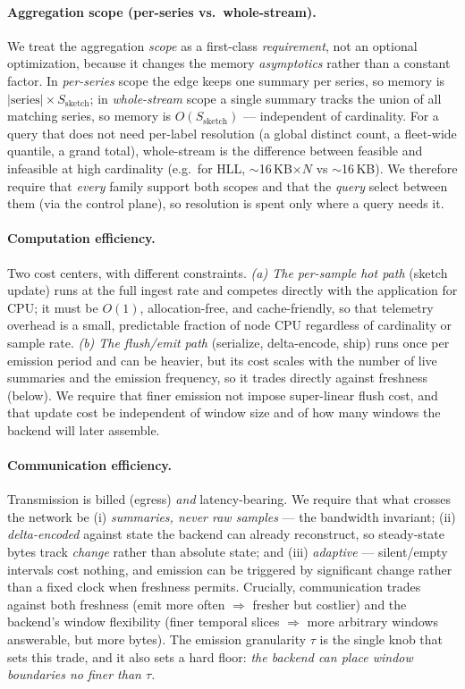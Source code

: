 \paragraph{Aggregation scope (per-series vs.\ whole-stream).}
We treat the aggregation \emph{scope} as a first-class
\emph{requirement}, not an optional optimization, because it changes the
memory \emph{asymptotics} rather than a constant factor. In
\emph{per-series} scope the edge keeps one summary per series, so memory is
$|\text{series}| \times S_\text{sketch}$; in \emph{whole-stream} scope a
single summary tracks the union of all matching series, so memory is
$O(S_\text{sketch})$ --- independent of cardinality. For a query that does
not need per-label resolution (a global distinct count, a fleet-wide
quantile, a grand total), whole-stream is the difference between feasible
and infeasible at high cardinality (e.g.\ for HLL, $\sim$16\,KB$\times N$
vs $\sim$16\,KB). We therefore require that \emph{every} family support
both scopes and that the \emph{query} select between them (via the control
plane), so resolution is spent only where a query needs it.

\paragraph{Computation efficiency.}
Two cost centers, with different constraints.
\emph{(a) The per-sample hot path} (sketch update) runs at the full
ingest rate and competes directly with the application for CPU; it must be
$O(1)$, allocation-free, and cache-friendly, so that telemetry overhead is
a small, predictable fraction of node CPU regardless of cardinality or
sample rate. \emph{(b) The flush/emit path} (serialize, delta-encode,
ship) runs once per emission period and can be heavier, but its cost
scales with the number of live summaries and the emission frequency, so it
trades directly against freshness (below). We require that finer emission
not impose super-linear flush cost, and that update cost be independent of
window size and of how many windows the backend will later assemble.

\paragraph{Communication efficiency.}
Transmission is billed (egress) \emph{and} latency-bearing. We require
that what crosses the network be (i) \emph{summaries, never raw samples}
--- the bandwidth invariant; (ii) \emph{delta-encoded} against state the
backend can already reconstruct, so steady-state bytes track \emph{change}
rather than absolute state; and (iii) \emph{adaptive} --- silent/empty
intervals cost nothing, and emission can be triggered by significant
change rather than a fixed clock when freshness permits. Crucially,
communication trades against both freshness (emit more often $\Rightarrow$
fresher but costlier) and the backend's window flexibility (finer
temporal slices $\Rightarrow$ more arbitrary windows answerable, but more
bytes). The emission granularity $\tau$ is the single knob that sets this
trade, and it also sets a hard floor: \emph{the backend can place window
boundaries no finer than $\tau$.}

